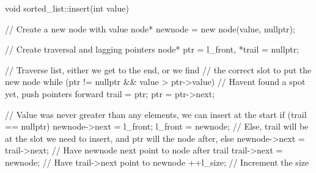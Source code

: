 \documentclass{report}
\begin{document}
    \pagebreak 
    \bigbreak \noindent 
    \begin{cppcode}
void sorted_list::insert(int value)
{
    // Create a new node with value
    node* newnode = new node(value, nullptr);

    // Create traversal and lagging pointers
    node* ptr = l_front, *trail = nullptr;

    // Traverse list, either we get to the end, or we find 
    // the correct slot to put the new node
    while (ptr != nullptr && value > ptr->value) {
        // Havent found a spot yet, push pointers forward
        trail = ptr; 
        ptr = ptr->next;
    }

    // Value was never greater than any elements, we can insert at the start
    if (trail == nullptr) { 
        newnode->next = l_front;
        l_front = newnode;
    // Else, trail will be at the slot we need to insert, and ptr will the node after,
    } else {
        newnode->next = trail->next; // Have newnode next point to node after trail
        trail->next = newnode; // Have trail->next point to newnode
    }
    ++l_size; // Increment the size
}
    \end{cppcode}
\end{document}
